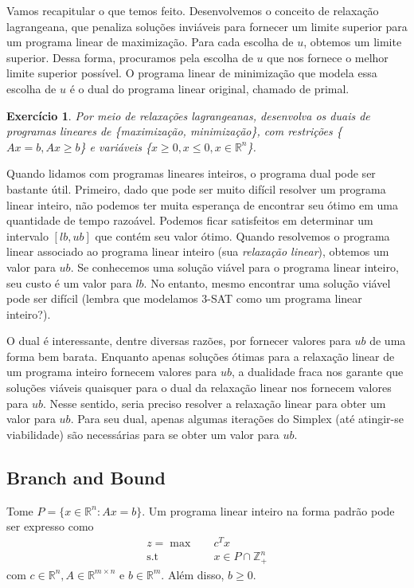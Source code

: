 \documentclass[]{article}
\newtheorem{exercicio}{Exercício}
\numberwithin{equation}{section}
\begin{document}
Vamos recapitular o que temos feito.
Desenvolvemos o conceito de relaxação lagrangeana, que penaliza soluções inviáveis para fornecer um
limite superior para um programa linear de maximização.
Para cada escolha de $u$, obtemos um limite superior.
Dessa forma, procuramos pela escolha de $u$ que nos fornece o melhor limite superior possível.
O programa linear de minimização que modela essa escolha de $u$ é o dual do programa linear original,
chamado de primal.

\begin{exercicio}
  Por meio de relaxações lagrangeanas, desenvolva os duais de programas lineares de \{maximização,
  minimização\}, com
  restrições \{$Ax = b, Ax \geq b$\} e variáveis \{$x \geq 0, x \leq 0, x \in \mathbb{R}^n$\}.
\end{exercicio}

Quando lidamos com programas lineares inteiros, o programa dual pode ser bastante útil.
Primeiro, dado que pode ser muito difícil resolver um programa linear inteiro, não podemos ter muita
esperança de encontrar seu ótimo em uma quantidade de tempo razoável.
Podemos ficar satisfeitos em determinar um intervalo $[lb, ub]$ que contém seu valor ótimo.
Quando resolvemos o programa linear associado ao programa linear inteiro (sua \emph{relaxação linear}),
obtemos um valor para $ub$.
Se conhecemos uma solução viável para o programa linear inteiro, seu custo é um valor para $lb$.
No entanto, mesmo encontrar uma solução viável pode ser difícil (lembra que modelamos 3-SAT como um
programa linear inteiro?).

O dual é interessante, dentre diversas razões, por fornecer valores para $ub$ de uma forma bem barata.
Enquanto apenas soluções ótimas para a relaxação linear de um programa inteiro fornecem valores para
$ub$, a dualidade fraca nos garante que soluções viáveis quaisquer para o dual da relaxação linear nos
fornecem valores para $ub$.
Nesse sentido, seria preciso resolver a relaxação linear para obter um valor para $ub$.
Para seu dual, apenas algumas iterações do Simplex (até atingir-se viabilidade) são necessárias para se
obter um valor para $ub$.

\subsection{Branch and Bound}

Tome $P = \{x \in \mathbb{R}^n : Ax = b\}$.
Um programa linear inteiro na forma padrão pode ser expresso como
\begin{align}
z = \max        &\quad  c^Tx                  \\
    \text{s.t}  &\quad  x \in P \cap \mathbb{Z}_+^n
\end{align}
com $c \in \mathbb{R}^n, A \in \mathbb{R}^{m \times n}$ e $b \in \mathbb{R}^m$.
Além disso, $b \geq 0$.
\end{document}
